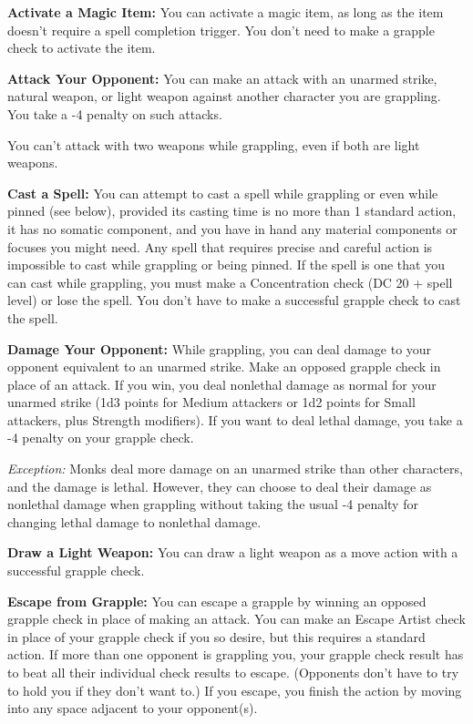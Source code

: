 \documentclass{article}
\begin{document}
\textbf{Activate a Magic Item:} You can activate a magic item, as long as the item 
doesn't require a spell completion trigger. You don't need to make a grapple check 
to activate the item.

\textbf{Attack Your Opponent:} You can make an attack with an unarmed strike, natural 
weapon, or light weapon against another character you are grappling. You take a 
-4 penalty on such attacks.

You can't attack with two weapons while grappling, even if both are light weapons.

\textbf{Cast a Spell:} You can attempt to cast a spell while grappling or even 
while pinned (see below), provided its casting time is no more than 1 standard 
action, it has no somatic component, and you have in hand any material components 
or focuses you might need. Any spell that requires precise and careful action\textit{ 
}is impossible to cast while grappling or being pinned. If the spell is one that 
you can cast while grappling, you must make a Concentration check (DC 20 + spell 
level) or lose the spell. You don't have to make a successful grapple check to 
cast the spell.

\textbf{Damage Your Opponent:} While grappling, you can deal damage to your opponent 
equivalent to an unarmed strike. Make an opposed grapple check in place of an attack. 
If you win, you deal nonlethal damage as normal for your unarmed strike (1d3 points 
for Medium attackers or 1d2 points for Small attackers, plus Strength modifiers). 
If you want to deal lethal damage, you take a -4 penalty on your grapple check.

\textit{Exception: }Monks deal more damage on an unarmed strike than other characters, 
and the damage is lethal. However, they can choose to deal their damage as nonlethal 
damage when grappling without taking the usual -4 penalty for changing lethal damage 
to nonlethal damage.

\textbf{Draw a Light Weapon:} You can draw a light weapon as a move action with 
a successful grapple check.

\textbf{Escape from Grapple:} You can escape a grapple by winning an opposed grapple 
check in place of making an attack. You can make an Escape Artist check in place 
of your grapple check if you so desire, but this requires a standard action. If 
more than one opponent is grappling you, your grapple check result has to beat 
all their individual check results to escape. (Opponents don't have to try to hold 
you if they don't want to.) If you escape, you finish the action by moving into 
any space adjacent to your opponent(s).
\end{document}
